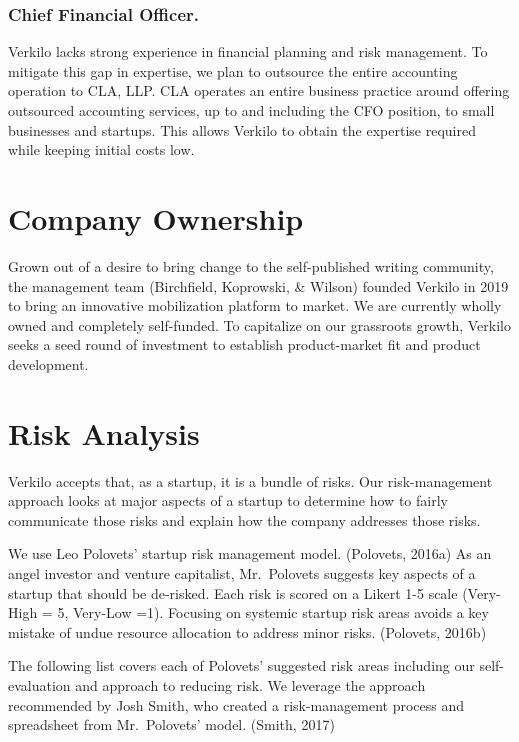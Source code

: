 \documentclass[11pt,openany]{book}
\begin{document}
\hypertarget{chief-financial-officer.}{%
\subsubsection{Chief Financial
Officer.}\label{chief-financial-officer.}}

Verkilo lacks strong experience in financial planning and risk
management. To mitigate this gap in expertise, we plan to outsource the
entire accounting operation to CLA, LLP. CLA operates an entire business
practice around offering outsourced accounting services, up to and
including the CFO position, to small businesses and startups. This
allows Verkilo to obtain the expertise required while keeping initial
costs low.

\hypertarget{company-ownership}{%
\section{Company Ownership}\label{company-ownership}}

Grown out of a desire to bring change to the self-published writing
community, the management team (Birchfield, Koprowski, \& Wilson)
founded Verkilo in 2019 to bring an innovative mobilization platform to
market. We are currently wholly owned and completely self-funded. To
capitalize on our grassroots growth, Verkilo seeks a seed round of
investment to establish product-market fit and product development.

\hypertarget{risk-analysis}{%
\section{Risk Analysis}\label{risk-analysis}}

Verkilo accepts that, as a startup, it is a bundle of risks. Our
risk-management approach looks at major aspects of a startup to
determine how to fairly communicate those risks and explain how the
company addresses those risks.

We use Leo Polovets' startup risk management model. (Polovets, 2016a) As
an angel investor and venture capitalist, Mr.~Polovets suggests key
aspects of a startup that should be de-risked. Each risk is scored on a
Likert 1-5 scale (Very-High = 5, Very-Low =1). Focusing on systemic
startup risk areas avoids a key mistake of undue resource allocation to
address minor risks. (Polovets, 2016b)

The following list covers each of Polovets' suggested risk areas
including our self-evaluation and approach to reducing risk. We leverage
the approach recommended by Josh Smith, who created a risk-management
process and spreadsheet from Mr.~Polovets' model. (Smith, 2017)
\end{document}
